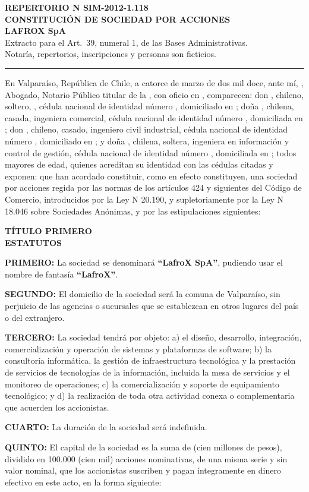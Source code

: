 \documentclass[10pt]{article}
\newcommand{\clau}[2]{\par\needspace{4\baselineskip}\textbf{#1:} #2\par}
\newcommand{\encab}[2]{\begin{center}\bfseries #1\\[2pt] #2\end{center}}
\begin{document}
\RaggedRight
\begin{center}
\textbf{REPERTORIO N\textdegree{} SIM-2012-1.118}\\[6pt]
\textbf{CONSTITUCIÓN DE SOCIEDAD POR ACCIONES}\\
\textbf{LAFROX SpA}\\[6pt]
{\small Extracto para el Art.~39\textdegree, numeral 1, de las Bases Administrativas.\\Notaría, repertorios, inscripciones y personas son ficticios.}
\end{center}
\hrule\vspace{6pt}

En Valparaíso, República de Chile, a catorce de marzo de dos mil doce, ante mí, \textbf{\MakeUppercase{\SIMnotarioTitular}}, Abogado, Notario Público titular de la \SIMnotaria, con oficio en \SIMnotariaDir, comparecen: don \textbf{\SIMsocioAnombre}, chileno, soltero, \SIMprofesion, cédula nacional de identidad número \SIMsocioArun, domiciliado en \SIMsocioAdom; doña \textbf{\SIMsocioBnombre}, chilena, casada, ingeniera comercial, cédula nacional de identidad número \SIMsocioBrun, domiciliada en \SIMsocioBdom; don \textbf{\SIMsocioCnombre}, chileno, casado, ingeniero civil industrial, cédula nacional de identidad número \SIMsocioCrun, domiciliado en \SIMsocioCdom; y doña \textbf{\SIMsocioDnombre}, chilena, soltera, ingeniera en información y control de gestión, cédula nacional de identidad número \SIMsocioDrun, domiciliada en \SIMsocioDdom; todos mayores de edad, quienes acreditan su identidad con las cédulas citadas y exponen: que han acordado constituir, como en efecto constituyen, una sociedad por acciones regida por las normas de los artículos 424 y siguientes del Código de Comercio, introducidos por la Ley N\textdegree{} 20.190, y supletoriamente por la Ley N\textdegree{} 18.046 sobre Sociedades Anónimas, y por las estipulaciones siguientes:

\encab{TÍTULO PRIMERO}{ESTATUTOS}

\clau{PRIMERO}{La sociedad se denominará \textbf{``LafroX SpA''}, pudiendo usar el nombre de fantasía \textbf{``LafroX''}.}
\clau{SEGUNDO}{El domicilio de la sociedad será la comuna de Valparaíso, sin perjuicio de las agencias o sucursales que se establezcan en otros lugares del país o del extranjero.}
\clau{TERCERO}{La sociedad tendrá por objeto: a) el diseño, desarrollo, integración, comercialización y operación de sistemas y plataformas de software; b) la consultoría informática, la gestión de infraestructura tecnológica y la prestación de servicios de tecnologías de la información, incluida la mesa de servicios y el monitoreo de operaciones; c) la comercialización y soporte de equipamiento tecnológico; y d) la realización de toda otra actividad conexa o complementaria que acuerden los accionistas.}
\clau{CUARTO}{La duración de la sociedad será indefinida.}
\clau{QUINTO}{El capital de la sociedad es la suma de \SIMcapitalinicial{} (cien millones de pesos), dividido en 100.000 (cien mil) acciones nominativas, de una misma serie y sin valor nominal, que los accionistas suscriben y pagan íntegramente en dinero efectivo en este acto, en la forma siguiente:}
\end{document}
